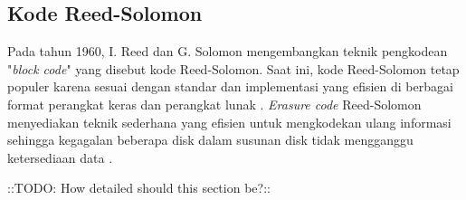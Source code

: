 \subsection{Kode Reed-Solomon}

Pada tahun 1960, I. Reed dan G. Solomon mengembangkan teknik pengkodean  "\textit{block code}" yang disebut kode Reed-Solomon. Saat ini, kode Reed-Solomon tetap populer karena sesuai dengan standar dan implementasi yang efisien di berbagai format perangkat keras dan perangkat lunak \parencite{minio2022erasure}. \textit{Erasure code} Reed-Solomon menyediakan teknik sederhana yang efisien untuk mengkodekan ulang informasi sehingga kegagalan beberapa disk dalam susunan disk tidak mengganggu ketersediaan data \parencite{manasse2009reed}.


::TODO: How detailed should this section be?::